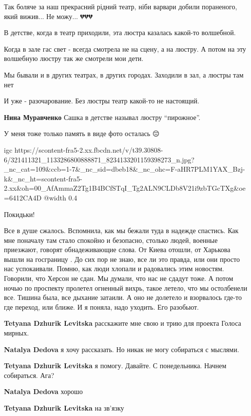 
Так боляче за наш прекрасний рідний театр, ніби варвари добили пораненого, який вижив... Не можу... 💔💔💔


В детстве, когда в театр приходили, эта люстра казалась какой-то волшебной.

Когда в зале гас свет - всегда смотрела не на сцену, а на люстру. А потом на
эту волшебную люстру так же смотрели мои дети.

Мы бывали и в других театрах, в других городах. Заходили в зал, а люстры там
нет

И уже - разочарование. Без люстры театр какой-то не настоящий.

\begin{itemize} %
\textbf{Нина Муравченко} Сашка в детстве называл люстру \enquote{пирожное}.
\end{itemize} %


У меня тоже только память в виде фото осталась 😔

\ifcmt
  igc https://scontent-fra5-2.xx.fbcdn.net/v/t39.30808-6/321411321_1133286800888871_8234133201159398273_n.jpg?_nc_cat=109&ccb=1-7&_nc_sid=dbeb18&_nc_ohc=F-aHR7PLM1YAX_Bzj-k&_nc_ht=scontent-fra5-2.xx&oh=00_AfAmmaZ2Tg1B4BCfSTqI_Tg2ALN9CLDb8V21i9zbTGcTXg&oe=6412CA4D
	@width 0.4
\fi


Покидьки!


Все в душе сжалось. Вспомнила, как мы бежали туда в надежде спастись. Как мне
поначалу там стало спокойно и безопасно, столько людей, военные приезжают,
говорят обнадеживающие слова. От Киева отошли, от Харькова вышли на госграницу
. До сих пор не знаю, все ли это правда, или они просто нас успокаивали.
Помню, как люди хлопали и радовались этим новостям. Говорили, что Херсон не
сдан. Мы думали, что нас не сдадут тоже. А потом ночью по проспекту пролетел
огненный вихрь, такое летело, что мы остолбенели все. Тишина была, все дыхание
затаили. А оно не долетело и взорвалось где-то где переход, или ближе. И я
поняла, надо уходить. Его разобьют.

\begin{itemize} %
\textbf{Tetyana Dzhurik Levitska} расскажите мне свою и трию для проекта Голоса мирных. 💙💛

\textbf{Natalya Dedova} я хочу рассказать. Но никак не могу собираться с мыслями.

\textbf{Tetyana Dzhurik Levitska} я помогу. Давайте. С понедельника. Начнем собираться. Ага?

\textbf{Natalya Dedova} хорошо

\textbf{Tetyana Dzhurik Levitska} на зв'язку
\end{itemize} %


